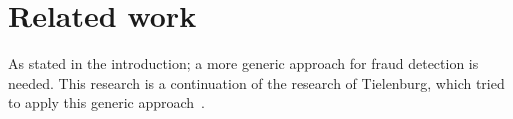 \documentclass{ou-report}
\newcommand{\todo}[1]{{\color{red} TODO: #1}}
\newcommand{\outline}[1]{{\color{blue} #1}}
\begin{document}

\chapter{Related work}
\label{chp:related_work}

As stated in the introduction; a more generic approach for fraud detection is 
needed. This research is a continuation of the research of 
Tielenburg, which tried to apply this generic approach~\cite{TEJ2017}.
\end{document}
